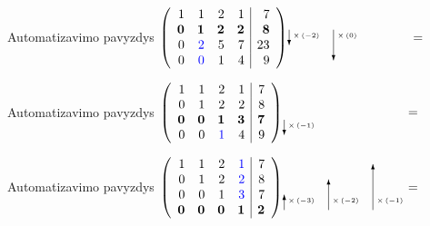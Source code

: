 \documentclass{beamer}
\begin{document}
\begin{frame}[fragile]{Automatizavimo pavyzdys}
\noindent$\left(\begin{array}{rrrr|r}
1 & 1 & 2 & 1 & 7\\
\bm{0} & \bm{1} & \bm{2} & \bm{2} & \bm{8}\\
0 & \textcolor{blue}{2} & 5 & 7 & 23\\
0 & \textcolor{blue}{0} & 1 & 4 & 9\\
\end{array}\right)
\setlength{\unitlength}{1pt}
\begin{picture} (95, 0)
\put(0.0, 9.0){\vector(0, -1){12}}
\put(3.0, 3.0){\tiny{$\times\left(-2\right)$}}
\put(35.0, 9.0){\vector(0, -1){24}}
\put(38.0, 3.0){\tiny{$\times\left(0\right)$}}
\end{picture}=$
\end{frame}

\begin{frame}[fragile]{Automatizavimo pavyzdys}
\noindent$\left(\begin{array}{rrrr|r}
1 & 1 & 2 & 1 & 7\\
0 & 1 & 2 & 2 & 8\\
\bm{0} & \bm{0} & \bm{1} & \bm{3} & \bm{7}\\
0 & 0 & \textcolor{blue}{1} & 4 & 9\\
\end{array}\right)
\setlength{\unitlength}{1pt}
\begin{picture} (95, 0)
\put(0.0, -3.0){\vector(0, -1){12}}
\put(3.0, -9.0){\tiny{$\times\left(-1\right)$}}
\end{picture}=$
\end{frame}

\begin{frame}[fragile]{Automatizavimo pavyzdys}
\noindent$\left(\begin{array}{rrrr|r}
1 & 1 & 2 & \textcolor{blue}{1} & 7\\
0 & 1 & 2 & \textcolor{blue}{2} & 8\\
0 & 0 & 1 & \textcolor{blue}{3} & 7\\
\bm{0} & \bm{0} & \bm{0} & \bm{1} & \bm{2}\\
\end{array}\right)
\setlength{\unitlength}{1pt}
\begin{picture} (95, 0)
\put(0.0, -15.0){\vector(0, 1){12}}
\put(3.0, -9.0){\tiny{$\times\left(-3\right)$}}
\put(35.0, -15.0){\vector(0, 1){24}}
\put(38.0, -9.0){\tiny{$\times\left(-2\right)$}}
\put(70.0, -15.0){\vector(0, 1){36}}
\put(73.0, -9.0){\tiny{$\times\left(-1\right)$}}
\end{picture}=$
\end{frame}
\end{document}
